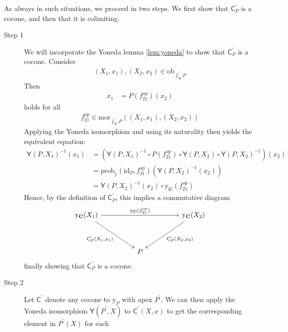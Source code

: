 \begin{prf}
As always in such situations, we proceed in two steps.
We first show that $\mathsf{C}_{P}^{\prime}$ is a cocone, and then that it is colimiting.
\begin{description}
\item[Step 1]
We will incorporate the Yoneda lemma \ref{lem:yoneda} to show that $\mathsf{C}_{P}^{\prime}$ is a cocone.
Consider
\begin{align*}
  (X_{1},x_{1}),
  (X_{2},x_{2})
  \in
  \mathrm{ob}_{\int_{\mathbf{C}}^{\prime}P}
\end{align*}
Then
\begin{align*}
  x_{1}
  &=
  P(f_{21}^{\mathrm{op}})(x_{2})
\end{align*}
holds for all
\begin{align*}
  f_{21}^{\mathrm{op}}
  \in
  \mathrm{mor}_{\int_{\mathbf{C}}^{\prime}P}
  \left(
    (X_{1},x_{1}),
    (X_{2},x_{2})
  \right)
\end{align*}
Applying the Yoneda isomorphism and using its naturality then yields the equivalent equation:
\begin{align*}
  \mathsf{Y}(P,X_{1})^{-1}(x_{1})
  &=
  \left(
    \mathsf{Y}(P,X_{1})^{-1}
    \circ
    P(f_{21}^{\mathrm{op}})
    \circ
    \mathsf{Y}(P,X_{2})
    \circ
    \mathsf{Y}(P,X_{2})^{-1}
  \right)
  (x_{2})
  \\
  &=
  \mathrm{prob}_{\mathrm{y}}(\mathrm{id}_{P},f_{21}^{\mathrm{op}})
  \left(
    \mathsf{Y}(P,X_{2})^{-1}(x_{2})
  \right)
  \tag{NT}
  \\
  &=
  \mathsf{Y}(P,X_{2})^{-1}(x_{2})
  \circ
  \mathrm{y}_{\mathbf{C}}(f_{21}^{\mathrm{op}})
\end{align*}
Hence, by the definition of $\mathsf{C}_{P}^{\prime}$, this implies a commutative diagram
\[
\begin{tikzcd}[sep=huge]
  \mathrm{y}_{\mathbf{C}}(X_{1})
  \arrow{rr}{\mathrm{y}_{\mathbf{C}}(f_{21}^{\mathrm{op}})}
  \arrow[swap]{dr}{\mathsf{C}_{P}^{\prime}(X_{1},x_{1})}
  &
  &
  \mathrm{y}_{\mathbf{C}}(X_{2})
  \arrow{dl}{\mathsf{C}_{P}^{\prime}(X_{2},x_{2})}
  \\
  &
  P
  &
\end{tikzcd}
\]
finally showing that $\mathsf{C}_{P}^{\prime}$ is a cocone.
\\
\item[Step 2]
Let $\mathsf{C}^{\prime}$ denote any cocone to $\mathrm{y}_{P}$ with apex $P^{\backprime}$.
We can then apply the Yoneda isomorphism $\mathsf{Y}(P^{\backprime},X)$ to $\mathsf{C}^{\prime}(X,x)$ to get the corresponding element in $P^{\backprime}(X)$ for each

\end{description}
\end{prf}
